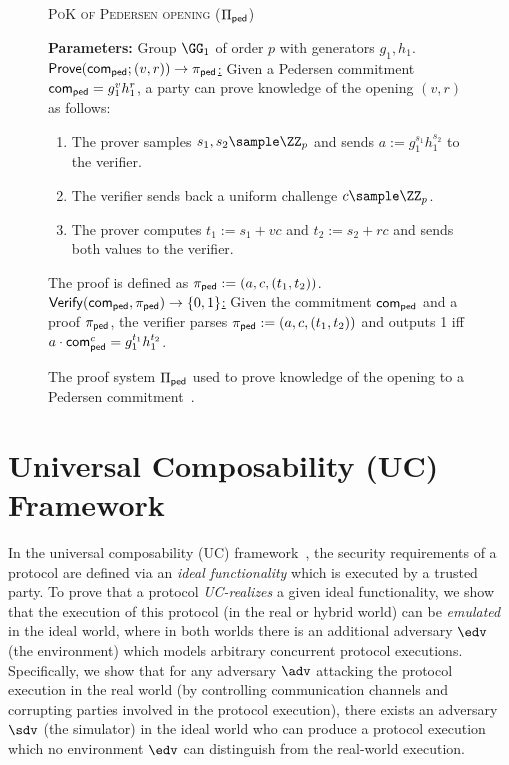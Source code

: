 \begin{figure*}[tbh]
   \centering
   \begin{mdframed}
   \begin{center}
       \textsc{PoK of Pedersen opening ($\Pi_{\sf ped}$)}
   \end{center}
   \medskip
   \textbf{Parameters:} Group $\GG_1$ of order $p$ with generators $g_1, h_1$.
   \hfill\medskip\\
   \underline{$\mathsf{Prove}(\mathsf{com}_{\sf ped}; (v, r)) \to \pi_{\sf ped}$:} Given a Pedersen commitment $\mathsf{com}_{\sf ped} = g_1^v h_1^r$, a party can prove knowledge of the opening $(v,r)$ as follows:
   \begin{enumerate}
       \item The prover samples $s_1, s_2 \sample \ZZ_p$ and sends $a := g_1^{s_1} h_1^{s_2}$ to the verifier.
       \item The verifier sends back a uniform challenge $c \sample \ZZ_p$.
       \item The prover computes $t_1 := s_1 + vc$ and $t_2 := s_2 + rc$ and sends both values to the verifier.
   \end{enumerate}
   The proof is defined as $\pi_{\sf ped} := (a, c, (t_1, t_2))$.\medskip\\
   \underline{${\mathsf{Verify}}(\mathsf{com}_{\sf ped}, \pi_{\sf ped}) \to \{0,1\}$:} Given the commitment $\mathsf{com}_{\sf ped}$ and a proof $\pi_{\sf ped}$, the verifier parses $\pi_{\sf ped} := (a, c, (t_1, t_2))$ and outputs 1 iff $a \cdot \mathsf{com}_{\sf ped}^c = g_1^{t_1} h_1^{t_2}$.
   \end{mdframed}
   \caption{The proof system $\Pi_{\sf ped}$ used to prove knowledge of the opening to a Pedersen commitment~\cite{C:Okamoto92}.}
   \label{fig:pi_ped}
\end{figure*}

\section{Universal Composability (UC) Framework}\label{sec:uc}

In the universal composability (UC) framework~\cite{FOCS:Canetti01}, the security requirements of a protocol are defined via an \emph{ideal functionality} which is executed by a trusted party. To prove that a protocol \emph{UC-realizes} a given ideal functionality, we show that the execution of this protocol (in the real or hybrid world) can be \emph{emulated} in the ideal world, where in both worlds there is an additional adversary $\env$ (the environment) which models arbitrary concurrent protocol executions. Specifically, we show that for any adversary $\adv$ attacking the protocol execution in the real world (by controlling communication channels and corrupting parties involved in the protocol execution), there exists an adversary $\Sim$ (the simulator) in the ideal world who can produce a protocol execution which no environment $\env$ can distinguish from the real-world execution.

